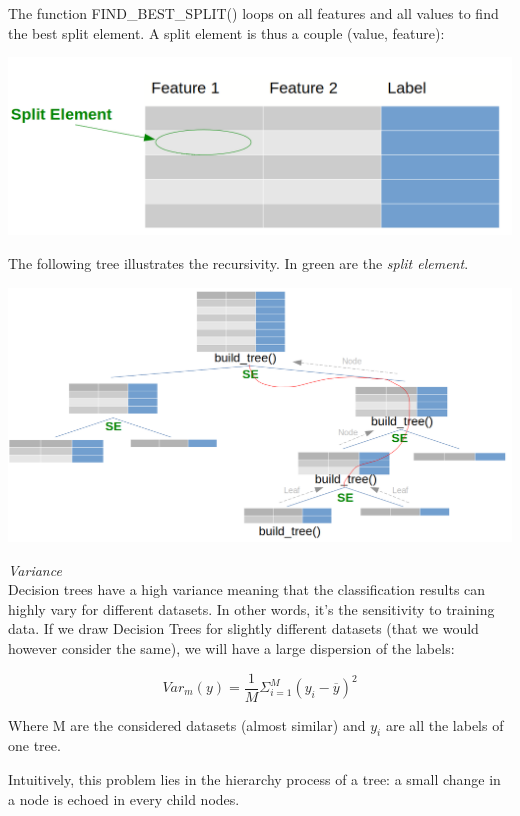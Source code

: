 The function FIND\_BEST\_SPLIT() loops on all features and all values to find the best split element. A split element is thus a couple (value, feature):

\begin{center}
\includegraphics[scale=0.2]{trees_split_element.png}
\end{center}

The following tree illustrates the recursivity. In green are the \textit{split element}.

\begin{center}
\includegraphics[scale=0.3]{trees_recursivity.png}
\end{center}

\textit{Variance} \\

Decision trees have a high variance meaning that the classification results can highly vary for different datasets. In other words, it's the sensitivity to training data. If we draw Decision Trees for slightly different datasets (that we would however consider the same), we will have a large dispersion of the labels:

$$Var_m(y) = \frac{1}{M}\Sigma_{i=1}^M(y_i - \overline{y})^2$$

Where M are the considered datasets (almost similar) and $y_i$ are all the labels of one tree.

Intuitively, this problem lies in the hierarchy process of a tree: a small change in a node is echoed in every child nodes.

\vspace{5mm}